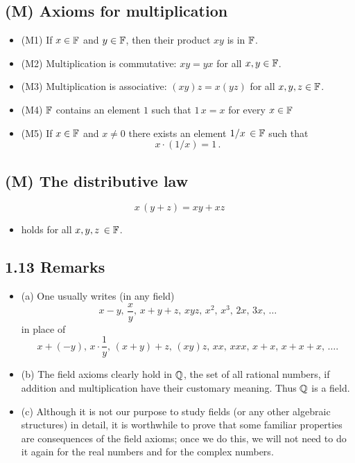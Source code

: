 \subsection*{(M)  Axioms for multiplication}
\begin{itemize}
\item[] (M1) If $x \in \mathbb{F}$ and $y \in \mathbb{F}$, then their product $xy$ is in $\mathbb{F}$.
\item[] (M2) Multiplication is commutative: $xy = yx$ for all $x, y \in \mathbb{F}$.
\item[] (M3) Multiplication is associative: $(xy)z = x(yz)$ for all $x, y, z \in \mathbb{F}$.
\item[] (M4) $\mathbb{F}$ contains an element $1$ such that $1\,x = x$ for every $x \in \mathbb{F}$
\item[] (M5) If $x \in \mathbb{F}$ and $x \neq 0$ there exists an element $1/x\,\in \mathbb{F}$  such that $$x \cdot (1/x) = 1\,.$$
\end{itemize}

\subsection*{(M)  The distributive law}
$$x\,(y + z) = xy + xz$$ 
\begin{itemize}
\item[] holds for all $x, y, z\,\in \mathbb{F}$. 
\end{itemize}

\subsection*{1.13 Remarks}
\begin{itemize}
\item[] (a) One usually writes (in any field) 
$$x - y,\,\frac{x}{y},\, x + y + z,\, xyz,\, x^2,\, x^3,\, 2x,\, 3x,\, \ldots$$ in place of
$$x + (- y),\,x \cdot \frac{1}{y},\, (x + y) + z,\, (xy)z,\, xx,\, xxx,\, x + x,\, x + x + x,\, \ldots .$$

\item[] (b) The field axioms clearly hold in $\mathbb{Q}$, the set of all rational numbers, if addition and multiplication have their customary meaning. Thus $\mathbb{Q}$ is a field. 
\item[] (c) Although it is not our purpose to study fields (or any other algebraic structures) in detail, it is worthwhile to prove that some familiar properties are consequences of the field axioms; once we do this, we will not need to do it again for the real numbers and for the complex numbers. 
\end{itemize}

